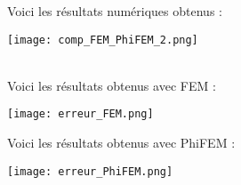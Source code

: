 Voici les résultats numériques obtenus :

\begin{minipage}{\linewidth}
	\centering
	\texttt{[image: comp\_FEM\_PhiFEM\_2.png]}
\end{minipage} \\

Voici les résultats obtenus avec FEM :

\begin{minipage}{\linewidth}
	\centering
	\texttt{[image: erreur\_FEM.png]}
\end{minipage}

Voici les résultats obtenus avec PhiFEM :

\begin{minipage}{\linewidth}
	\centering
	\texttt{[image: erreur\_PhiFEM.png]}
\end{minipage}